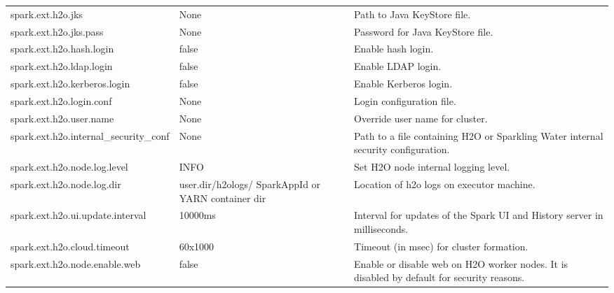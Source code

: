 \begin{footnotesize}
\begin{longtable}[!ht]{l p{2.0cm} p{3.0cm}}
spark.ext.h2o.jks & None & Path to Java KeyStore file. \\ \addlinespace

spark.ext.h2o.jks.pass & None & Password for Java KeyStore file. \\ \addlinespace

spark.ext.h2o.hash.login & false & Enable hash login. \\ \addlinespace

spark.ext.h2o.ldap.login & false & Enable LDAP login. \\ \addlinespace

spark.ext.h2o.kerberos.login & false & Enable Kerberos login. \\ \addlinespace

spark.ext.h2o.login.conf & None & Login configuration file. \\ \addlinespace

spark.ext.h2o.user.name & None & Override user name for cluster. \\ \addlinespace

spark.ext.h2o.internal\_security\_conf & None & Path to a file containing H2O or Sparkling Water internal security configuration. \\ \addlinespace

spark.ext.h2o.node.log.level & INFO & Set H2O node internal logging level. \\ \addlinespace

spark.ext.h2o.node.log.dir  & {user.dir}/h2ologs/ {SparkAppId} or YARN container dir  & Location of h2o logs on executor machine.\\ \addlinespace

spark.ext.h2o.ui.update.interval & 10000ms & Interval for updates of the Spark UI and History server in milliseconds. \\ \addlinespace

spark.ext.h2o.cloud.timeout & 60x1000 & Timeout (in msec) for cluster formation. \\ \addlinespace

spark.ext.h2o.node.enable.web & false & Enable or disable web on H2O worker nodes. It is disabled by default for security reasons. \\

\bottomrule
\end{longtable}
\end{footnotesize}


